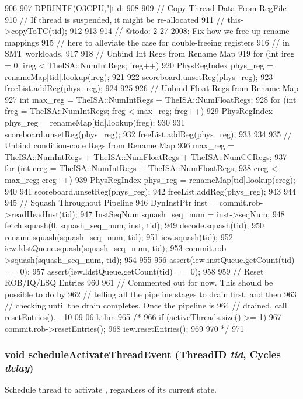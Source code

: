 \begin{DoxyCode}
906 {
907     DPRINTF(O3CPU,"[tid:%
908 
909     // Copy Thread Data From RegFile
910     // If thread is suspended, it might be re-allocated
911     // this->copyToTC(tid);
912 
913 
914     // @todo: 2-27-2008: Fix how we free up rename mappings
915     // here to alleviate the case for double-freeing registers
916     // in SMT workloads.
917 
918     // Unbind Int Regs from Rename Map
919     for (int ireg = 0; ireg < TheISA::NumIntRegs; ireg++) {
920         PhysRegIndex phys_reg = renameMap[tid].lookup(ireg);
921 
922         scoreboard.unsetReg(phys_reg);
923         freeList.addReg(phys_reg);
924     }
925 
926     // Unbind Float Regs from Rename Map
927     int max_reg = TheISA::NumIntRegs + TheISA::NumFloatRegs;
928     for (int freg = TheISA::NumIntRegs; freg < max_reg; freg++) {
929         PhysRegIndex phys_reg = renameMap[tid].lookup(freg);
930 
931         scoreboard.unsetReg(phys_reg);
932         freeList.addReg(phys_reg);
933     }
934 
935     // Unbind condition-code Regs from Rename Map
936     max_reg = TheISA::NumIntRegs + TheISA::NumFloatRegs + TheISA::NumCCRegs;
937     for (int creg = TheISA::NumIntRegs + TheISA::NumFloatRegs;
938          creg < max_reg; creg++) {
939         PhysRegIndex phys_reg = renameMap[tid].lookup(creg);
940 
941         scoreboard.unsetReg(phys_reg);
942         freeList.addReg(phys_reg);
943     }
944 
945     // Squash Throughout Pipeline
946     DynInstPtr inst = commit.rob->readHeadInst(tid);
947     InstSeqNum squash_seq_num = inst->seqNum;
948     fetch.squash(0, squash_seq_num, inst, tid);
949     decode.squash(tid);
950     rename.squash(squash_seq_num, tid);
951     iew.squash(tid);
952     iew.ldstQueue.squash(squash_seq_num, tid);
953     commit.rob->squash(squash_seq_num, tid);
954 
955 
956     assert(iew.instQueue.getCount(tid) == 0);
957     assert(iew.ldstQueue.getCount(tid) == 0);
958 
959     // Reset ROB/IQ/LSQ Entries
960 
961     // Commented out for now.  This should be possible to do by
962     // telling all the pipeline stages to drain first, and then
963     // checking until the drain completes.  Once the pipeline is
964     // drained, call resetEntries(). - 10-09-06 ktlim
965 /*
966     if (activeThreads.size() >= 1) {
967         commit.rob->resetEntries();
968         iew.resetEntries();
969     }
970 */
971 }
\end{DoxyCode}
\hypertarget{classFullO3CPU_a20e502f38206c8cd988064e7bed53bb5}{
\subsubsection[{scheduleActivateThreadEvent}]{\setlength{\rightskip}{0pt plus 5cm}void scheduleActivateThreadEvent ({\bf ThreadID} {\em tid}, \/  {\bf Cycles} {\em delay})}}
\label{classFullO3CPU_a20e502f38206c8cd988064e7bed53bb5}
Schedule thread to activate , regardless of its current state. 


